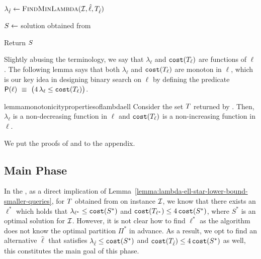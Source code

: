 \documentclass{article}
\begin{document}
\begin{algorithm}[]
{        
    }

    $\lambda_{\hat{\ell}}\gets \textsc{Find\-Min\-Lambda}(\mathcal{I}, \hat{\ell}, T_{\hat{\ell}})$\;\label{algo:finphst}

    $S \gets $ solution obtained from~\;\label{algo:finalphend}

    Return $S$
\end{algorithm}






Slightly abusing the terminology, we say that $\lambda_\ell$ and $\texttt{cost}(T_{\ell})$ are functions of $\ell$. The following lemma says that both $\lambda_{\ell}$ and $\texttt{cost}(T_{\ell})$ are monoton in $\ell$, which is our key idea in designing binary search on $\ell$ by defining the predicate $\mathsf{P}(\ell) ~\equiv~ \bigl( 4\,\lambda_{\ell} \leq \texttt{cost}(T_{\ell}) \bigr)$. 

\begin{restatable}{lemma}{monotonicitypropertiesoflambdaell}
    \label{lemma:monotonicity-properties-of-lambda-ell}
    Consider the set $T$ returned by \bcfrss. Then,    $\lambda_{\ell}$ is a non-decreasing function in $\ell$ and $\texttt{cost}(T_{\ell})$ is a non-increasing function in $\ell$.
\end{restatable}

We put the proofs of  and  to the appendix. 
 

\subsection{Main Phase}\label{sec:mainphase}
In the , 
as a direct implication of Lemma~\ref{lemma:lambda-ell-star-lower-bound-smaller-queries}, for $T$ obtained from \bcfrss on \ordfairkcen instance $\mathcal{I}$, we know that 
there exists an $\ell^*$ which holds that 
$\lambda_{\ell^*} \leq \texttt{cost}(S^*)$ and $\texttt{cost}(T_{\ell^*}) \leq 4\, \texttt{cost}(S^*)$, where $S^*$ is an optimal solution for $\mathcal{I}$.
However, it is not clear how to find $\ell^*$ as the algorithm does not know the optimal partition $\Pi^*$ in advance. 
As a result, we opt to find an alternative $\hat{\ell}$ that satisfies $\lambda_{\hat{\ell}} \leq \texttt{cost}(S^*)$ and $\texttt{cost}(T_{\hat{\ell}}) \leq 4\, \texttt{cost}(S^*)$ as well, this constitutes the main goal of this phase. 
\end{document}

